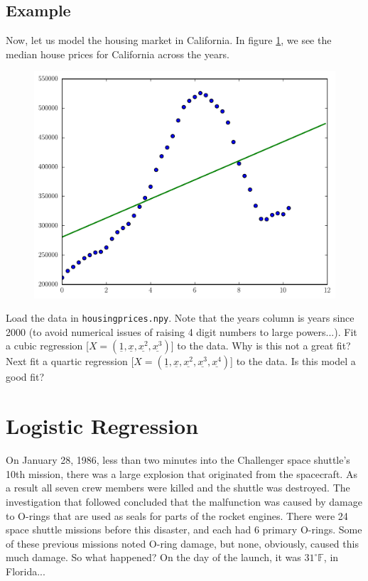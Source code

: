 \subsection*{Example}
Now, let us model the housing market in California.
In figure \ref{fig:CaliforniaPrices}, we see the median house prices for California across the years. 

\begin{figure}
\includegraphics[width=\textwidth]{cali-linear.pdf}    
\label{fig:CaliforniaPrices}
\end{figure}

\begin{problem}
Load the data in \texttt{housingprices.npy}.
Note that the years column is years since 2000 (to avoid numerical issues of raising 4 digit numbers to large powers...).
Fit a cubic regression [$X=(\underline{1},\underline{x},\underline{x^2},\underline{x^3})$] to the data.
Why is this not a great fit?
Next fit a quartic regression [$X=(\underline{1},\underline{x},\underline{x^2},\underline{x^3},\underline{x^4})$] to the data.
Is this model a good fit?
\end{problem}


\section*{Logistic Regression}
On January 28, 1986, less than two minutes into the Challenger space shuttle's 10th mission, there was a large explosion that originated from the spacecraft. 
As a result all seven crew members were killed and the shuttle was destroyed. 
The investigation that followed concluded that the malfunction was caused by damage to O-rings that are used as seals for parts of the rocket engines. 
There were 24 space shuttle missions before this disaster, and each had 6 primary O-rings.
Some of these previous missions noted O-ring damage, but none, obviously, caused this much damage.
So what happened?
On  the day of the launch, it was $31^{\circ}  \mathbb{F}$, in Florida...

